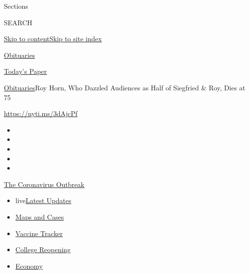 Sections

SEARCH

\protect\hyperlink{site-content}{Skip to
content}\protect\hyperlink{site-index}{Skip to site index}

\href{https://www.nytimes3xbfgragh.onion/section/obituaries}{Obituaries}

\href{https://myaccount.nytimes3xbfgragh.onion/auth/login?response_type=cookie\&client_id=vi}{}

\href{https://www.nytimes3xbfgragh.onion/section/todayspaper}{Today's
Paper}

\href{/section/obituaries}{Obituaries}\textbar{}Roy Horn, Who Dazzled
Audiences as Half of Siegfried \& Roy, Dies at 75

\url{https://nyti.ms/3dAjcPf}

\begin{itemize}
\item
\item
\item
\item
\item
\end{itemize}

\href{https://www.nytimes3xbfgragh.onion/news-event/coronavirus?action=click\&pgtype=Article\&state=default\&region=TOP_BANNER\&context=storylines_menu}{The
Coronavirus Outbreak}

\begin{itemize}
\tightlist
\item
  live\href{https://www.nytimes3xbfgragh.onion/2020/08/04/world/coronavirus-covid-19.html?action=click\&pgtype=Article\&state=default\&region=TOP_BANNER\&context=storylines_menu}{Latest
  Updates}
\item
  \href{https://www.nytimes3xbfgragh.onion/interactive/2020/us/coronavirus-us-cases.html?action=click\&pgtype=Article\&state=default\&region=TOP_BANNER\&context=storylines_menu}{Maps
  and Cases}
\item
  \href{https://www.nytimes3xbfgragh.onion/interactive/2020/science/coronavirus-vaccine-tracker.html?action=click\&pgtype=Article\&state=default\&region=TOP_BANNER\&context=storylines_menu}{Vaccine
  Tracker}
\item
  \href{https://www.nytimes3xbfgragh.onion/2020/08/02/us/covid-college-reopening.html?action=click\&pgtype=Article\&state=default\&region=TOP_BANNER\&context=storylines_menu}{College
  Reopening}
\item
  \href{https://www.nytimes3xbfgragh.onion/live/2020/08/03/business/stock-market-today-coronavirus?action=click\&pgtype=Article\&state=default\&region=TOP_BANNER\&context=storylines_menu}{Economy}
\end{itemize}

